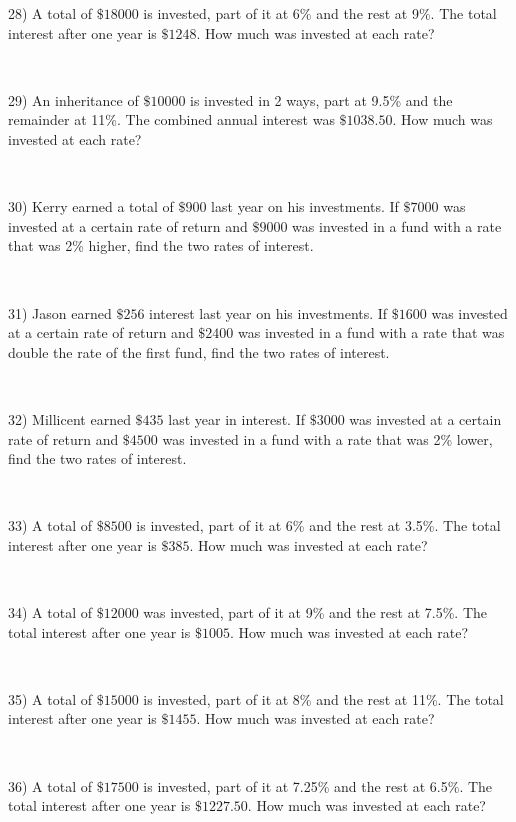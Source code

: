 {28) A total of $\$18000$ is invested, part of it at 6\% and the rest
at 9\%. The total interest after one year is
$\$1248$. How much was invested at each rate?\par
~\par

29) An inheritance of $\$10000$ is invested in 2 ways, part at 9.5\%
and the remainder at 11\%. The combined
annual interest was $\$1038.50$. How much was
invested at each rate?\par
~\par

30) Kerry earned a total of $\$900$ last year on his investments. If
$\$7000$ was invested at a certain rate
of return and $\$9000$ was invested in a fund with a rate that was 2\% higher, find the two rates of interest.\par
~\par

31) Jason earned $\$256$ interest last year on his investments. If
$\$1600$ was invested at a certain rate of return and
$\$2400$ was invested in a fund with a rate that  was
double the rate of the first fund, find the two rates of interest.\par
~\par

32) Millicent earned $\$435$ last year in interest. If
$\$3000$ was invested at a certain  rate of return and
$\$4500$ was invested in a fund with a rate that was 2\% lower, find the two rates of interest.\par
~\par

33) A total of $\$8500$ is invested, part of it at 6\% and the rest
at 3.5\%. The total interest after one year is $\$385$.
How much was invested at each rate?\par
~\par

34) A total of $\$12000$ was invested, part of it at 9\% and the rest
at 7.5\%. The total interest after one year is
$\$1005$. How much was invested at each rate?\par
~\par

35) A total of $\$15000$ is invested, part of it at 8\% and the rest
at 11\%. The total  interest after one year is $\$1455$.
How much was invested at each rate?\par
~\par

36) A total of $\$17500$ is invested, part of it at 7.25\% and the
rest at 6.5\%. The total interest after one year is
$\$1227.50$. How much was invested at each rate?\par
~\par

}
